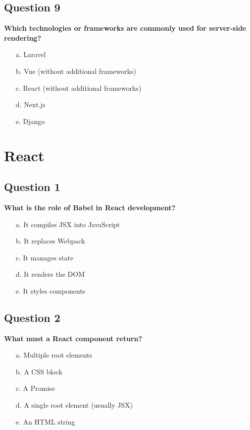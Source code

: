 \documentclass{article}
\begin{document}
\subsection*{Question 9}
\textbf{Which technologies or frameworks are commonly used for server-side rendering?}

\begin{itemize}
  \item[a.] Laravel
  \item[b.] Vue (without additional frameworks)
  \item[c.] React (without additional frameworks)
  \item[d.] Next.js
  \item[e.] Django
\end{itemize}


\section{React}

\subsection*{Question 1}
\textbf{What is the role of Babel in React development?}

\begin{itemize}
  \item[a.] It compiles JSX into JavaScript
  \item[b.] It replaces Webpack
  \item[c.] It manages state
  \item[d.] It renders the DOM
  \item[e.] It styles components
\end{itemize}

\subsection*{Question 2}
\textbf{What must a React component return?}

\begin{itemize}
  \item[a.] Multiple root elements
  \item[b.] A CSS block
  \item[c.] A Promise
  \item[d.] A single root element (usually JSX)
  \item[e.] An HTML string
\end{itemize}
\end{document}
